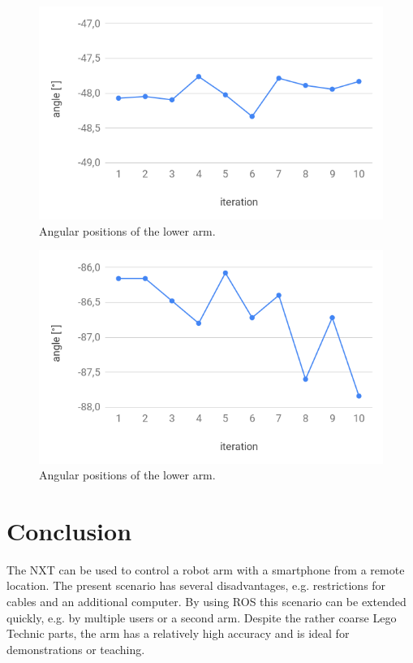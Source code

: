 \documentclass[conference]{IEEEtran}
\begin{document}
\begin{figure}[htbp]
	\centerline{\includegraphics[scale=0.3]{img/angle_lower.png}}
	\caption{Angular positions of the lower arm.}
	\label{fig:lowerjointprecision}
\end{figure}

\begin{figure}[htbp]
	\centerline{\includegraphics[scale=0.3]{img/angle_upper.png}}
	\caption{Angular positions of the lower arm.}
	\label{fig:upperjointprecision}
\end{figure}

\section{Conclusion}
The NXT can be used to control a robot arm with a smartphone from a remote location. The present scenario has several disadvantages, e.g. restrictions for cables and an additional computer.
By using ROS this scenario can be extended quickly, e.g. by multiple users or a second arm. Despite the rather coarse Lego Technic parts, the arm has a relatively high accuracy and is ideal for demonstrations or teaching.
\end{document}
